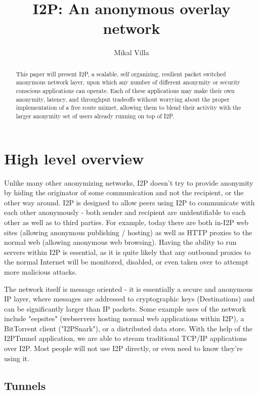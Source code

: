 \documentclass[a4paper,twocolumn,12pt]{article}
\title{I2P: An anonymous overlay network}
\author{Mikal Villa}
\begin{document}
\maketitle

\begin{abstract}\noindent
This paper will present I2P, a scalable, self organizing, resilient packet switched anonymous network layer, upon which any number of different anonymity or security conscious applications can operate. Each of these applications may make their own anonymity, latency, and throughput tradeoffs without worrying about the proper implementation of a free route mixnet, allowing them to blend their activity with the larger anonymity set of users already running on top of I2P.
\end{abstract}

\tableofcontents

\section{High level overview}

Unlike many other anonymizing networks, I2P doesn't try to provide anonymity by hiding the originator of some communication and not the recipient, or the other way around. I2P is designed to allow peers using I2P to communicate with each other anonymously - both sender and recipient are unidentifiable to each other as well as to third parties. For example, today there are both in-I2P web sites (allowing anonymous publishing / hosting) as well as HTTP proxies to the normal web (allowing anonymous web browsing). Having the ability to run servers within I2P is essential, as it is quite likely that any outbound proxies to the normal Internet will be monitored, disabled, or even taken over to attempt more malicious attacks.

The network itself is message oriented - it is essentially a secure and anonymous IP layer, where messages are addressed to cryptographic keys (Destinations) and can be significantly larger than IP packets. Some example uses of the network include "eepsites" (webservers hosting normal web applications within I2P), a BitTorrent client ("I2PSnark"), or a distributed data store. With the help of the I2PTunnel application, we are able to stream traditional TCP/IP applications over I2P. Most people will not use I2P directly, or even need to know they're using it.


\subsection{Tunnels}
\end{document}
